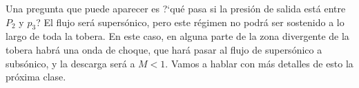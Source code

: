 Una pregunta que puede aparecer es \mbox{?`}qué pasa si la presión de salida está entre $P_2$ y $p_3$?
El flujo será supersónico, pero este régimen no podrá ser sostenido a lo largo de toda la tobera.
En este caso, en alguna parte de la zona divergente de la tobera habrá una onda de choque, que hará pasar al flujo de supersónico a subsónico, y la descarga será a $M<1$.
Vamos a hablar con más detalles de esto la próxima clase.
